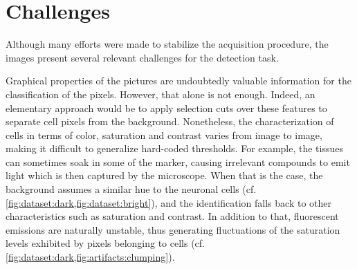 \section{Challenges}



Although many efforts were made to stabilize the acquisition procedure, the images present several relevant challenges for the detection task. 

Graphical properties of the pictures are undoubtedly valuable information for the classification of the pixels. However, that alone is not enough.
Indeed, an elementary approach would be to apply selection cuts over these features to separate cell pixels from the background.
Nonetheless, the characterization of cells in terms of color, saturation and contrast varies from image to image, making it difficult to generalize hard-coded thresholds.
For example, the tissues can sometimes soak in some of the marker, causing irrelevant compounds to emit light which is then captured by the microscope. 
When that is the case, the background assumes a similar hue to the neuronal cells (cf. \cref{fig:dataset:dark,fig:dataset:bright}), and the identification falls back to other characteristics such as saturation and contrast.
In addition to that, fluorescent emissions are naturally unstable, thus generating fluctuations of the saturation levels exhibited by pixels belonging to cells (cf. \cref{fig:dataset:dark,fig:artifacts:clumping}).

